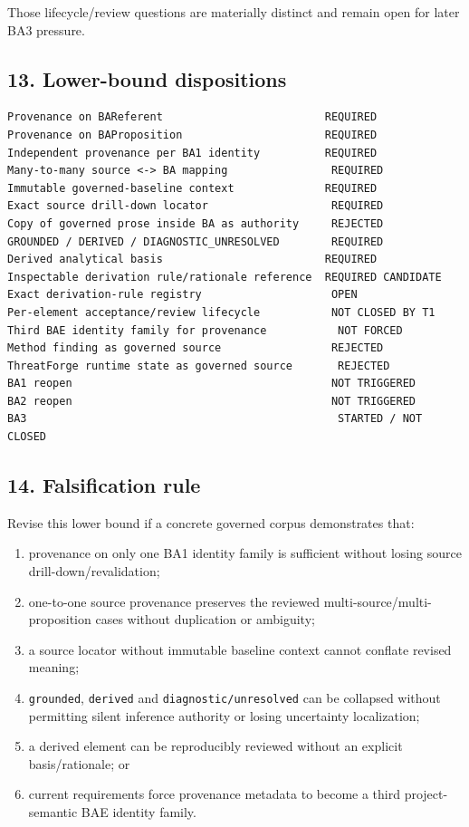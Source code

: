 \documentclass[11pt,a4paper]{article}
\providecommand{\tightlist}{\setlength{\itemsep}{0pt}\setlength{\parskip}{0pt}}
\begin{document}
Those lifecycle/review questions are materially distinct and remain open for later BA3 pressure.

\subsection{13. Lower-bound dispositions}\label{13-lower-bound-dispositions}

\begin{verbatim}
Provenance on BAReferent                         REQUIRED
Provenance on BAProposition                      REQUIRED
Independent provenance per BA1 identity          REQUIRED
Many-to-many source <-> BA mapping                REQUIRED
Immutable governed-baseline context              REQUIRED
Exact source drill-down locator                   REQUIRED
Copy of governed prose inside BA as authority     REJECTED
GROUNDED / DERIVED / DIAGNOSTIC_UNRESOLVED        REQUIRED
Derived analytical basis                         REQUIRED
Inspectable derivation rule/rationale reference  REQUIRED CANDIDATE
Exact derivation-rule registry                    OPEN
Per-element acceptance/review lifecycle           NOT CLOSED BY T1
Third BAE identity family for provenance           NOT FORCED
Method finding as governed source                 REJECTED
ThreatForge runtime state as governed source       REJECTED
BA1 reopen                                        NOT TRIGGERED
BA2 reopen                                        NOT TRIGGERED
BA3                                                STARTED / NOT CLOSED
\end{verbatim}

\subsection{14. Falsification rule}\label{14-falsification-rule}

Revise this lower bound if a concrete governed corpus demonstrates that:

\begin{enumerate}
\def\labelenumi{\arabic{enumi}.}
\tightlist
\item
  provenance on only one BA1 identity family is sufficient without losing source drill-down/revalidation;
\item
  one-to-one source provenance preserves the reviewed multi-source/multi-proposition cases without duplication or ambiguity;
\item
  a source locator without immutable baseline context cannot conflate revised meaning;
\item
  \texttt{grounded}, \texttt{derived} and \texttt{diagnostic/unresolved} can be collapsed without permitting silent inference authority or losing uncertainty localization;
\item
  a derived element can be reproducibly reviewed without an explicit basis/rationale; or
\item
  current requirements force provenance metadata to become a third project-semantic BAE identity family.
\end{enumerate}
\end{document}
